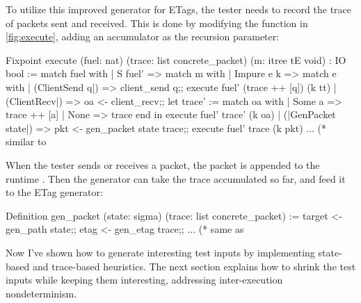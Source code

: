 To utilize this improved generator for ETags, the tester needs to record the
trace of packets sent and received.  This is done by modifying the 
function in \autoref{fig:execute}, adding an accumulator as the recursion parameter:
\begin{coq}
  Fixpoint execute (fuel: nat) (trace: list concrete_packet)
                   (m: itree tE void) : IO bool :=
    match fuel with
    | S fuel' =>
      match m with
      | Impure e k =>
        match e with
        | (ClientSend q|) => client_send q;;
                             execute fuel' (trace ++ [q]) (k tt)
        | (ClientRecv|)   => oa <- client_recv;;                             
                             let trace' := match oa with
                                           | Some a => trace ++ [a]
                                           | None   => trace
                                           end in
                             execute fuel' trace' (k oa)
        | (|GenPacket state|) => pkt <- gen_packet state trace;;
                                 execute fuel' trace (k pkt)
        ... (* similar to %
\end{coq}

When the tester sends or receives a packet, the packet is appended to the
runtime .  Then the  generator can take the trace
accumulated so far, and feed it to the ETag generator:
\begin{coq}
  Definition gen_packet (state: sigma) (trace: list concrete_packet) :=
    target <- gen_path state;;
    etag   <- gen_etag trace;;
    ... (* same as %
\end{coq}

Now I've shown how to generate interesting test inputs by implementing
state-based and trace-based heuristics.  The next section explains how to shrink
the test inputs while keeping them interesting, addressing inter-execution
nondeterminism.
